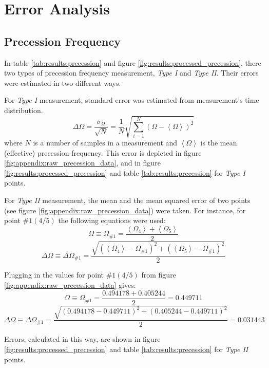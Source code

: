 \section{Error Analysis} \label{appendix:errors}

\subsection{Precession Frequency}
\label{appendix:errors:precession_frequency}

In table \ref{tab:results:precession} and figure \ref{fig:results:processed_precession}, there two types of precession frequency measurement, \emph{Type I} and \emph{Type II}. Their errors were estimated in two different ways.

For \emph{Type I} measurement, standard error was estimated from measurement's time distribution.
\begin{equation*}
  \Delta\Omega = \frac{\sigma_{\Omega}}{\sqrt{N}} = \frac{1}{N}\sqrt{\sum\limits_{i=1}^N(\Omega - \left<\Omega\right>)^2}
\end{equation*}
where $N$ is a number of samples in a measurement and $\left< \Omega \right>$ is the mean (effective) precession frequency. This error is depicted in figure \ref{fig:appendix:raw_precession_data}, and in figure \ref{fig:results:processed_precession} and table \ref{tab:results:precession} for \emph{Type I} points.

For \emph{Type II} measurement, the mean and the mean squared error of two points (see figure \ref{fig:appendix:raw_precession_data}) were taken. For instance, for point $\#1 (4/5)$ the following equations were used:
\begin{equation*}
  \Omega \equiv \Omega_{\#1} = \frac{\left< \Omega_{4} \right> + \left< \Omega_{5} \right>}{2}
\end{equation*}
\begin{equation*}
  \Delta\Omega \equiv \Delta\Omega_{\#1} = \frac{\sqrt{(\left< \Omega_{4} \right> - \Omega_{\#1})^{2} + (\left< \Omega_{5} \right> - \Omega_{\#1})^{2}}}{2}
\end{equation*}

Plugging in the values for point $\#1 (4/5)$ from figure \ref{fig:appendix:raw_precession_data} gives:
\begin{equation*}
  \Omega \equiv \Omega_{\#1} = \frac{0.494178 + 0.405244}{2} = 0.449711
\end{equation*}
\begin{equation*}
  \Delta\Omega \equiv \Delta\Omega_{\#1} = \frac{\sqrt{(0.494178 - 0.449711)^{2} + (0.405244 - 0.449711)^{2}}}{2} = 0.031443
\end{equation*}

Errors, calculated in this way, are shown in figure \ref{fig:results:processed_precession} and table \ref{tab:results:precession} for \emph{Type II} points.
